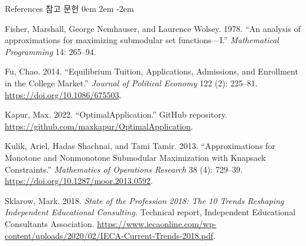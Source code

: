 \documentclass[11pt,mathserif,notheorems]{beamer}
\theoremstyle{definition}
\theoremstyle{definition}
\begin{document}
\begin{frame}{\ifen References \else 참고 문헌 \fi}
\parskip 0em
\leftskip 2em
\parindent -2em


Fisher, Marshall, George Nemhauser, and Laurence Wolsey. 1978. ``An analysis of approximations for maximizing submodular set functions—I.'' \emph{Mathematical Programming} 14: 265--94.

Fu, Chao. 2014. ``Equilibrium Tuition, Applications, Admissions, and Enrollment in the College Market.'' \emph{Journal of Political Economy} 122 (2): 225--81. \url{https://doi.org/10.1086/675503}. 

Kapur, Max. 2022. ``OptimalApplication.'' GitHub repository. \url{https://github.com/maxkapur/OptimalApplication}.


Kulik, Ariel, Hadas Shachnai, and Tami Tamir. 2013. ``Approximations for Monotone and Nonmonotone Submodular Maximization with Knapsack Constraints.'' \emph{Mathematics of Operations Research} 38 (4): 729--39. \url{https://doi.org/10.1287/moor.2013.0592}.

%

Sklarow, Mark. 2018. \emph{State of the Profession 2018: The 10 Trends Reshaping Independent Educational Consulting.} Technical report, Independent Educational Consultants Association. \url{https://www.iecaonline.com/wp-content/uploads/2020/02/IECA-Current-Trends-2018.pdf}.

\end{frame}
\end{document}
